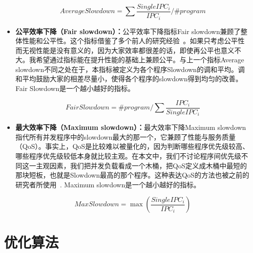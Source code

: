 \begin{itemize}
\begin{equation}
	AverageSlowdown = \sum\frac{SingleIPC_i}{IPC_i} / \#program
\end{equation}

\item \textbf{公平效率下降（Fair slowdown）：}公平效率下降指标Fair slowdown兼顾了整体性能和公平性。这个指标借鉴了多个前人的研究经验~\parencite{luo2001balancing, chang2014cooperative}。如果只考虑公平性而无视性能是没有意义的，因为大家效率都很差的话，即使再公平也意义不大。我希望通过指标能在提升性能的基础上兼顾公平。与上一个指标Average slowdown不同之处在于，本指标被定义为各个程序Slowdown的调和平均。调和平均鼓励大家的相差尽量小，使得各个程序的slowdown得到均匀的改善。Fair Slowdown是一个越小越好的指标。

\begin{equation}
	FairSlowdown = \#program / {\sum\frac{IPC_i}{SingleIPC_i}}
\end{equation}

\item \textbf{最大效率下降（Maximum slowdown）：}最大效率下降Maximum slowdown指代所有并发程序中的slowdown最大的那一个，它兼顾了性能与服务质量（QoS）。事实上，QoS是比较难以被量化的，因为判断哪些程序优先级较高、哪些程序优先级较低本身就比较主观。在本文中，我们不讨论程序间优先级不同这一主观因素，我们把并发负载看成一个木桶，把QoS定义成木桶中最短的那块短板，也就是Slowdown最高的那个程序。这种表达QoS的方法也被之前的研究者所使用~\parencite{manikantan2012probabilistic}. Maximum slowdown是一个越小越好的指标。

\begin{equation}
MaxSlowdown=\max(\frac{SingleIPC_i}{IPC_i})
\label{eq:qos}
\end{equation}

\end{itemize}

\section{优化算法}


